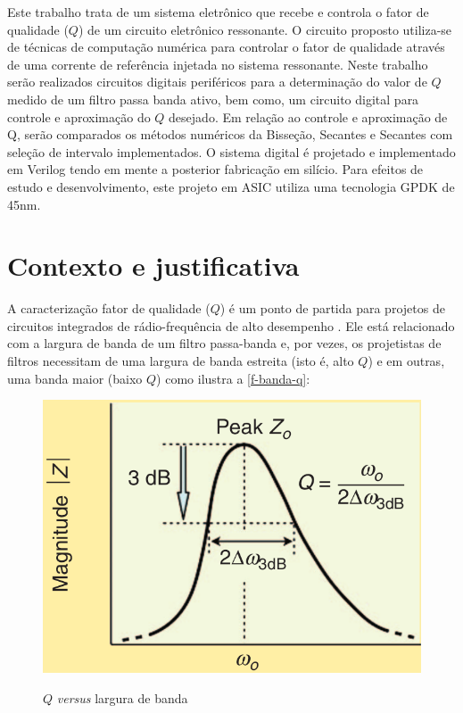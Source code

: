 \documentclass[
	article,			%
	11pt,				%
	oneside,			%
	a4paper,			%
	twocolumn,
	english,			%
	brazil,				%
	sumario=tradicional
	]{abntex2}
\begin{document}
% 

Este trabalho trata de um sistema eletrônico que recebe e controla o fator de qualidade ($Q$) de um circuito eletrônico ressonante. O circuito proposto utiliza-se de técnicas de computação numérica para controlar o fator de qualidade através de uma corrente de referência injetada no sistema ressonante. Neste trabalho serão realizados circuitos digitais periféricos para a determinação do valor de $Q$ medido de um filtro passa banda ativo, bem como, um circuito digital para controle e aproximação do $Q$ desejado. Em relação ao controle e aproximação de Q, serão comparados os métodos numéricos da Bisseção, Secantes e Secantes com seleção de intervalo implementados. O sistema digital é projetado e implementado em Verilog tendo em mente a posterior fabricação em silício. Para efeitos de estudo e desenvolvimento, este projeto em ASIC utiliza uma tecnologia GPDK de 45nm.


\section{Contexto e justificativa}

A caracterização fator de qualidade ($Q$) é um ponto de partida para projetos de circuitos integrados de rádio-frequência de alto desempenho \cite{what-is-q-takashi}. Ele está relacionado com a largura de banda de um filtro passa-banda e, por vezes, os projetistas de filtros necessitam de uma largura de banda estreita (isto é, alto $Q$) e em outras, uma banda maior (baixo $Q$) como ilustra a \autoref{f-banda-q}:

\begin{figure}[H]
    \centering
    \caption{$Q$ \textit{versus} largura de banda}
    \includegraphics[width=.5\textwidth]{fig/q-band.png}
    \label{f-banda-q}
\end{figure}
\end{document}
